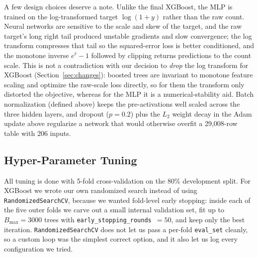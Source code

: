 \documentclass[journal]{IEEEtran}
\begin{document}
A few design choices deserve a note. Unlike the final XGBoost, the MLP is
trained on the log-transformed target $\log(1+y)$ rather than the raw count.
Neural networks are sensitive to the scale and skew of the target, and the raw
target's long right tail produced unstable gradients and slow convergence; the
log transform compresses that tail so the squared-error loss is better
conditioned, and the monotone inverse $e^{\hat r}-1$ followed by clipping returns
predictions to the count scale. This is not a contradiction with our decision to
\emph{drop} the log transform for XGBoost (Section~\ref{sec:changes}): boosted
trees are invariant to monotone feature scaling and optimize the raw-scale loss
directly, so for them the transform only distorted the objective, whereas for the
MLP it is a numerical-stability aid. Batch normalization
(defined above) keeps the pre-activations well scaled across the three hidden
layers, and dropout ($p=0.2$) plus the $L_2$ weight decay in the Adam update
above regularize a network that would otherwise overfit a 29{,}008-row table with 206
inputs.

\subsection{Hyper-Parameter Tuning}
\label{sec:tuning}
All tuning is done with 5-fold cross-validation on the 80\% development split.
For XGBoost we wrote our own randomized search instead of using
\texttt{RandomizedSearchCV}, because we wanted fold-level early stopping: inside
each of the five outer folds we carve out a small internal validation set, fit
up to $B_{\max}=3000$ trees with \texttt{early\_stopping\_rounds}~$=50$, and keep
only the best iteration. \texttt{RandomizedSearchCV} does not let us pass a
per-fold \texttt{eval\_set} cleanly, so a custom loop was the simplest correct
option, and it also let us log every configuration we tried.
\end{document}
